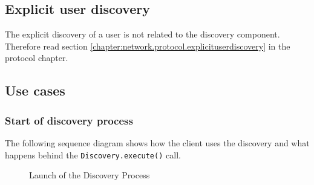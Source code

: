 \subsection{Explicit user discovery}
The explicit discovery of a user is not related to the discovery component. Therefore read section \ref{chapter:network.protocol.explicituserdiscovery} in the protocol chapter.

\subsection{Use cases}
\subsubsection{Start of discovery process}
The following sequence diagram shows how the client uses the discovery and what happens behind the \texttt{Discovery.execute()} call.

\begin{figure}[H]
 \centering
 \caption{Launch of the Discovery Process}
 \label{fig:network.discovery.launch}
\end{figure}

